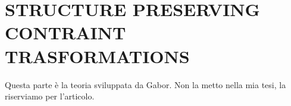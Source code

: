 

















\section{STRUCTURE PRESERVING CONTRAINT TRASFORMATIONS}\label{appendix B}

Questa parte è la teoria sviluppata da Gabor. Non la metto nella mia tesi, la riserviamo per l'articolo.













